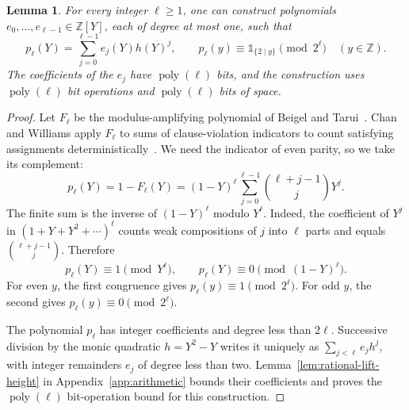 \documentclass[11pt,reqno]{amsart}
\numberwithin{equation}{section}
\newtheorem{lemma}[theorem]{Lemma}
\theoremstyle{definition}\newtheorem{definition}[theorem]{Definition}
\theoremstyle{remark}\newtheorem{remark}[theorem]{Remark}
\newcommand{\poly}{\operatorname{poly}}
\renewcommand{\ge}{\geqslant}
\begin{document}
\begin{lemma}\label{lem:rational-idempotent}
For every integer $\ell\ge1$, one can construct polynomials
$e_0,\ldots,e_{\ell-1}\in\mathbb Z[Y]$, each of degree at most one,
such that
\begin{equation}\label{eq:idempotent-expansion}
 p_\ell(Y)=\sum_{j=0}^{\ell-1}e_j(Y)h(Y)^j,
 \qquad
 p_\ell(y)\equiv\mathds{1}_{\{2\mid y\}}\pmod{2^\ell}
 \quad(y\in\mathbb Z).
\end{equation}
The coefficients of the $e_j$ have $\poly(\ell)$ bits, and the
construction uses $\poly(\ell)$ bit operations and $\poly(\ell)$
bits of space.
\end{lemma}
\begin{proof}
Let $F_\ell$ be the modulus-amplifying polynomial of Beigel and
Tarui~\cite[Section~2.3]{BT94}. Chan and Williams apply $F_\ell$ to
sums of clause-violation indicators to count satisfying assignments
deterministically~\cite[Theorem~2.5 and proof of Theorem~1.6]{CW21}.
We need the indicator of even parity, so we take its complement:
\begin{equation}\label{eq:binary-indicator}
 p_\ell(Y)=1-F_\ell(Y)=(1-Y)^\ell
       \sum_{j=0}^{\ell-1}\binom{\ell+j-1}{j}Y^j.
\end{equation}
The finite sum is the inverse of $(1-Y)^\ell$ modulo $Y^\ell$.
Indeed, the coefficient of $Y^j$ in $(1+Y+Y^2+\cdots)^\ell$
counts weak compositions of $j$ into $\ell$ parts and equals
$\binom{\ell+j-1}{j}$. Therefore
\[
 p_\ell(Y)\equiv1\pmod{Y^\ell},
 \qquad
 p_\ell(Y)\equiv0\pmod{(1-Y)^\ell}.
\]
For even $y$, the first congruence gives $p_\ell(y)\equiv1\pmod{2^\ell}$.
For odd $y$, the second gives $p_\ell(y)\equiv0\pmod{2^\ell}$.

The polynomial $p_\ell$ has integer coefficients and degree less
than $2\ell$. Successive division by the monic quadratic
$h=Y^2-Y$ writes it uniquely as
$\sum_{j<\ell}e_jh^j$, with integer remainders $e_j$ of degree
less than two. Lemma~\ref{lem:rational-lift-height} in
Appendix~\ref{app:arithmetic} bounds their coefficients and proves
the $\poly(\ell)$ bit-operation bound for this construction.
\end{proof}
\end{document}
